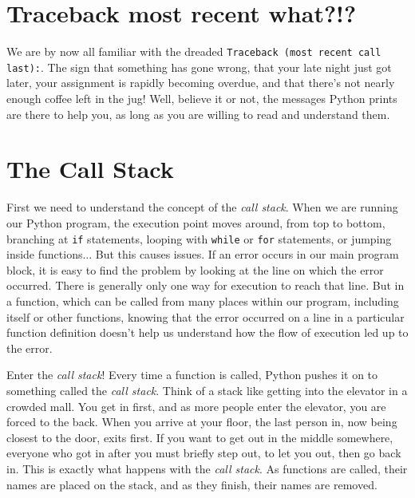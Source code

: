 \section{Traceback most recent what?!?}

We are by now all familiar with the dreaded 
\texttt{Traceback (most   recent call last):}. The sign that something has gone wrong, that   your late night just got later, your assignment is rapidly becoming   overdue, and that there's not nearly enough coffee left in the jug!   Well, believe it or not, the messages Python prints are there to help   you, as long as you are willing to read and understand them.

\section{The Call Stack}

First we need to understand the concept of the \textit{call stack}. When we   are running our Python program, the execution point moves around, from   top to bottom, branching at \texttt{if} statements, looping with \texttt{while} or \texttt{for}   statements, or jumping inside functions...  But this causes issues. If   an error occurs in our main program block, it is easy to find the problem by                  looking at the line on which the error occurred. There is generally only one way for   execution to reach that line. But in a function, which can be called   from many places within our program, including itself or other   functions, knowing that the error occurred on a line in a particular   function definition doesn't help us understand how the flow of   execution led up to the error.

Enter the \textit{call stack}! Every time a   function is called, Python pushes it on to something called the \textit{call   stack}. Think of a stack like getting into the elevator in a crowded   mall. You get in first, and as more people enter the elevator, you are   forced to the back. When you arrive at your floor, the last person in,   now being closest to the door, exits first. If you want to get out in   the middle somewhere, everyone who got in after you must briefly step   out, to let you out, then go back in. This is exactly what happens with   the \textit{call stack}. As functions are called, their names are placed on the   stack, and as they finish, their names are removed.


